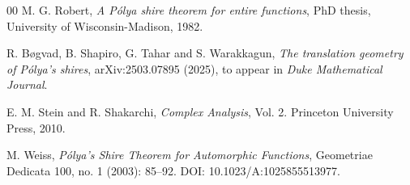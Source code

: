 \documentclass[12pt]{article}
\theoremstyle{plain}
\theoremstyle{definition}
\begin{document}
\begin{thebibliography}{00}
 M. G. Robert, 
\textit{A P\'olya shire theorem for entire functions}, PhD thesis, University of Wisconsin-Madison, 1982.

 R. B\o gvad, B. Shapiro, G. Tahar and S. Warakkagun,
\textit{The translation geometry of P\'olya's shires},
arXiv:2503.07895 (2025), to appear in \textit{Duke Mathematical Journal}.

 E. M. Stein and R. Shakarchi,
\textit{Complex Analysis}, Vol. 2. Princeton University Press, 2010.

 M. Weiss,
\textit{P\'olya's Shire Theorem for Automorphic Functions}, Geometriae Dedicata 100, no. 1 (2003): 85--92. DOI: 10.1023/A:1025855513977.

\end{thebibliography}
\end{document}
